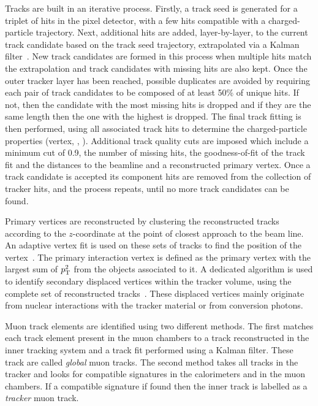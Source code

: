 Tracks are built in an iterative process.
Firstly, a track seed is generated for a triplet of hits in the pixel detector, with a few hits compatible with a charged-particle trajectory.
Next, additional hits are added, layer-by-layer, to the current track candidate based on the track seed trajectory, extrapolated via a Kalman filter~\cite{Event:KF}.
New track candidates are formed in this process when multiple hits match the extrapolation and track candidates with missing hits are also kept.
Once the outer tracker layer has been reached, possible duplicates are avoided by requiring each pair of track candidates to be composed of at least 50\% of unique hits.
If not, then the candidate with the most missing hits is dropped and if they are the same length then the one with the highest \chisq{} is dropped.
The final track fitting is then performed, using all associated track hits to determine the charged-particle properties (vertex, \pt{}, \etc{}).
Additional track quality cuts are imposed which include a minimum \pt{} cut of 0.9\GeV{}, the number of missing hits, the goodness-of-fit \chisq{} of the track fit and the distances to the beamline and a reconstructed primary vertex.
Once a track candidate is accepted its component hits are removed from the collection of tracker hits, and the process repeats, until no more track candidates can be found.

Primary vertices are reconstructed by clustering the reconstructed tracks according to the $z$-coordinate at the point of closest approach to the beam line.
An adaptive vertex fit is used on these sets of tracks to find the position of the vertex~\cite{Event:VertexFitting}.
The primary interaction vertex is defined as the primary vertex with the largest sum of $p_{\mathrm{T}}^{2}$ from the objects associated to it.
A dedicated algorithm is used to identify secondary displaced vertices within the tracker volume, using the complete set of reconstructed tracks~\cite{Event:SecondaryVertex1,Event:SecondaryVertex2}.
These displaced vertices mainly originate from nuclear interactions with the tracker material or from conversion photons.

Muon track elements are identified using two different methods.
The first matches each track element present in the muon chambers to a track reconstructed in the inner tracking system and a track fit performed using a Kalman filter.
These track are called \textit{global} muon tracks.
The second method takes all tracks in the tracker and looks for compatible signatures in the calorimeters and in the muon chambers. 
If a compatible signature if found then the inner track is labelled as a \textit{tracker} muon track.


